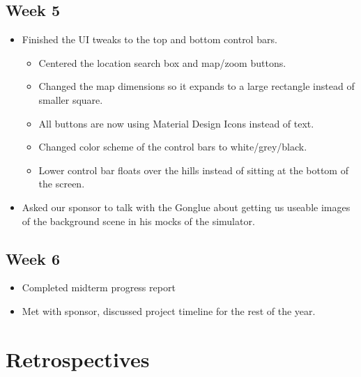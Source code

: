 \documentclass[10pt, onecolumn, draftclsnofoot, letterpaper, compsoc]{IEEEtran}
\begin{document}
\subsection{Week 5}

    \begin{itemize}

    \item Finished the UI tweaks to the top and bottom control bars.

        \begin{itemize}

            \item Centered the location search box and map/zoom buttons.

            \item Changed the map dimensions so it expands to a large rectangle instead of smaller square.

            \item All buttons are now using Material Design Icons instead of text.

            \item Changed color scheme of the control bars to white/grey/black.

            \item Lower control bar floats over the hills instead of sitting at the bottom of the screen.

        \end{itemize}

    \item Asked our sponsor to talk with the Gonglue about getting us useable images of the background
          scene in his mocks of the simulator.

    \end{itemize}

\subsection{Week 6}

    \begin{itemize}

    \item Completed midterm progress report

    \item Met with sponsor, discussed project timeline for the rest of the
          year.

    \end{itemize}

\newpage
\section{Retrospectives}
\end{document}
